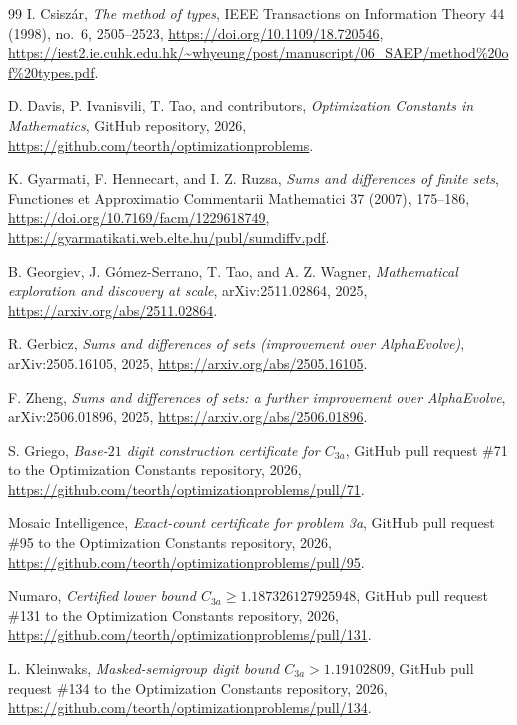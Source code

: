 \documentclass[11pt]{article}
\begin{document}
\begin{thebibliography}{99}
I. Csisz\'ar,
\emph{The method of types},
IEEE Transactions on Information Theory 44 (1998), no.~6, 2505--2523,
\url{https://doi.org/10.1109/18.720546},
\url{https://iest2.ie.cuhk.edu.hk/~whyeung/post/manuscript/06_SAEP/method\%20of\%20types.pdf}.

D. Davis, P. Ivanisvili, T. Tao, and contributors,
\emph{Optimization Constants in Mathematics},
GitHub repository, 2026,
\url{https://github.com/teorth/optimizationproblems}.

K. Gyarmati, F. Hennecart, and I. Z. Ruzsa,
\emph{Sums and differences of finite sets},
Functiones et Approximatio Commentarii Mathematici 37 (2007), 175--186,
\url{https://doi.org/10.7169/facm/1229618749},
\url{https://gyarmatikati.web.elte.hu/publ/sumdiffv.pdf}.

B. Georgiev, J. G\'omez-Serrano, T. Tao, and A. Z. Wagner,
\emph{Mathematical exploration and discovery at scale},
arXiv:2511.02864, 2025,
\url{https://arxiv.org/abs/2511.02864}.

R. Gerbicz,
\emph{Sums and differences of sets (improvement over AlphaEvolve)},
arXiv:2505.16105, 2025,
\url{https://arxiv.org/abs/2505.16105}.

F. Zheng,
\emph{Sums and differences of sets: a further improvement over AlphaEvolve},
arXiv:2506.01896, 2025,
\url{https://arxiv.org/abs/2506.01896}.

S. Griego,
\emph{Base-$21$ digit construction certificate for $C_{3a}$},
GitHub pull request \#71 to the Optimization Constants repository, 2026,
\url{https://github.com/teorth/optimizationproblems/pull/71}.

Mosaic Intelligence,
\emph{Exact-count certificate for problem 3a},
GitHub pull request \#95 to the Optimization Constants repository, 2026,
\url{https://github.com/teorth/optimizationproblems/pull/95}.

Numaro,
\emph{Certified lower bound $C_{3a}\ge1.187326127925948$},
GitHub pull request \#131 to the Optimization Constants repository, 2026,
\url{https://github.com/teorth/optimizationproblems/pull/131}.

L. Kleinwaks,
\emph{Masked-semigroup digit bound $C_{3a}>1.19102809$},
GitHub pull request \#134 to the Optimization Constants repository, 2026,
\url{https://github.com/teorth/optimizationproblems/pull/134}.


\end{thebibliography}
\end{document}
